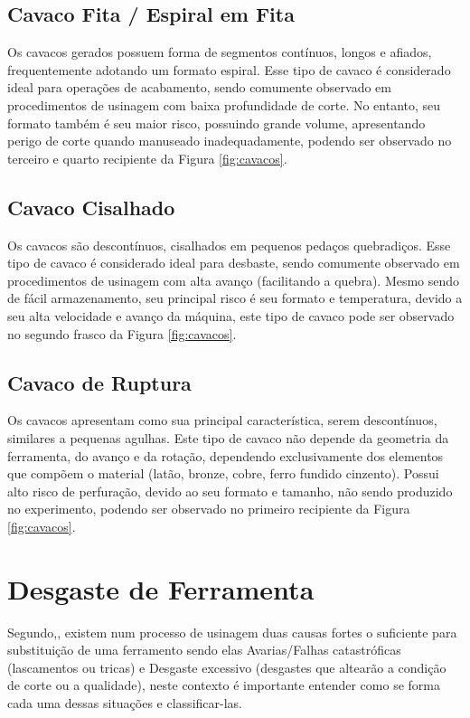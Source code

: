 \documentclass[deposito, acronym, symbols]{fei}
\begin{document}
\subsection{Cavaco Fita / Espiral em Fita}

Os cavacos gerados possuem forma de segmentos contínuos, longos e afiados, frequentemente adotando um formato espiral. Esse tipo de cavaco é considerado ideal para operações de acabamento, sendo comumente observado em procedimentos de usinagem com baixa profundidade de corte. No entanto, seu formato também é seu maior risco, possuindo grande volume, apresentando perigo de corte quando manuseado inadequadamente, podendo ser observado no terceiro e quarto recipiente da Figura \ref{fig:cavacos}.

\subsection{Cavaco Cisalhado}

Os cavacos são descontínuos, cisalhados em pequenos pedaços quebradiços. Esse tipo de cavaco é considerado ideal para desbaste, sendo comumente observado em procedimentos de usinagem com alta avanço (facilitando a quebra). Mesmo sendo de fácil armazenamento, seu principal risco é seu formato e temperatura, devido a seu alta velocidade e avanço da máquina, este tipo de cavaco pode ser observado no segundo frasco da Figura \ref{fig:cavacos}.

\subsection{Cavaco de Ruptura}

Os cavacos apresentam como sua principal característica, serem descontínuos, similares a pequenas agulhas. Este tipo de cavaco não depende da geometria da ferramenta, do avanço e da rotação, dependendo exclusivamente dos elementos que compõem o material (latão, bronze, cobre, ferro fundido cinzento). Possui alto risco de perfuração, devido ao seu formato e tamanho, não sendo produzido no experimento, podendo ser observado no primeiro recipiente da Figura \ref{fig:cavacos}.

\section{Desgaste de Ferramenta}

Segundo,\textcite{amorim2002estudo}, existem num processo de usinagem duas causas fortes o suficiente para substituição de uma ferramento sendo elas Avarias/Falhas catastróficas (lascamentos ou tricas) e Desgaste excessivo (desgastes que altearão a condição de corte ou a qualidade), neste contexto é importante entender como se forma cada uma dessas situações e classificar-las.
\end{document}
